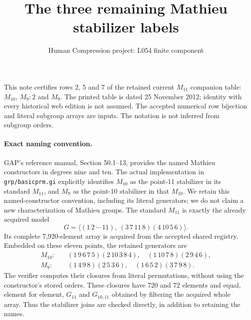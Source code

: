 \documentclass[11pt]{article}
\title{The three remaining Mathieu stabilizer labels}
\author{Human Compression project: L054 finite component}\date{}
\begin{document}
\maketitle
This note certifies rows 2, 5 and 7 of the retained current $M_{11}$ companion
table: $M_{10}$, $M_9:2$ and $M_9$. The printed table is dated
25 November 2012; identity with every historical web edition is not assumed.
The accepted numerical row bijection and literal subgroup arrays are inputs.
The notation is not inferred from subgroup orders.

\paragraph{Exact naming convention.}
GAP's reference manual, Section 50.1--13, provides the named Mathieu
constructors in degrees nine and ten. The actual implementation in
\texttt{grp/basicprm.gi} explicitly identifies $M_{10}$ as the point-11 stabilizer in its standard $M_{11}$,
and $M_9$ as the point-10 stabilizer in that $M_{10}$.
We retain this named-constructor convention, including its literal generators;
we do not claim a new characterization of Mathieu groups. The standard
$M_{11}$ is exactly the already acquired model
\[
 G=\langle(1\,2\,\cdots\,11),\ (3\,7\,11\,8)(4\,10\,5\,6)\rangle.
\]
Its complete 7,920-element array is acquired from the accepted shared registry.
Embedded on these eleven points, the retained generators are
\begin{align*}
 M_{10}:&\quad (1\,9\,6\,7\,5)(2\,10\,3\,8\,4),\quad
                 (1\,10\,7\,8)(2\,9\,4\,6),\\
 M_9:&\quad (1\,4\,9\,8)(2\,5\,3\,6),\quad
                 (1\,6\,5\,2)(3\,7\,9\,8).
\end{align*}
The verifier computes their closures from literal permutations, without using
the constructor's stored orders. These closures have 720 and 72 elements
and equal, element for element, $G_{11}$ and $G_{10,11}$ obtained by filtering
the acquired whole array. Thus the stabilizer joins are checked directly,
in addition to retaining the names.
\end{document}
